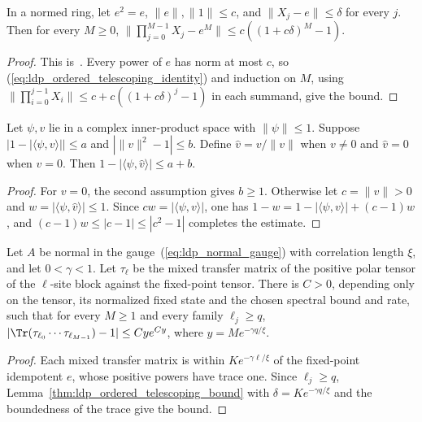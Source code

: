 \begin{lemma}
    \label{thm:ldp_ordered_telescoping_bound}
    \leanok
    In a normed ring, let $e^2=e$, $\lVert e\rVert,\lVert1\rVert\le c$, and
    $\lVert X_j-e\rVert\le\delta$ for every $j$. Then for every $M\ge0$,
    $\lVert\prod_{j=0}^{M-1}X_j-e^M\rVert
        \le c((1+c\delta)^M-1)$.
\end{lemma}
\begin{proof}\leanok
    This is~\cite[``First-order bound near an
        idempotent'']{QICLean2026Blueprint}.
    Every power of $e$ has norm at most $c$, so
    (\ref{eq:ldp_ordered_telescoping_identity}) and induction on $M$, using
    $\lVert\prod_{i=0}^{j-1}X_i\rVert
        \le c+c((1+c\delta)^j-1)$ in each summand, give the bound.
\end{proof}

\begin{lemma}
    \label{thm:ldp_normalization_triangle}
    \leanok
    Let $\psi,v$ lie in a complex inner-product space with
    $\lVert\psi\rVert\le1$. Suppose
    $|1-|\langle\psi,v\rangle||\le a$ and
    $|\lVert v\rVert^2-1|\le b$.
    Define $\widehat v=v/\lVert v\rVert$ when $v\ne0$ and
    $\widehat v=0$ when $v=0$. Then
    $1-|\langle\psi,\widehat v\rangle|\le a+b$.
\end{lemma}
\begin{proof}\leanok
    For $v=0$, the second assumption gives $b\ge1$.
    Otherwise let $c=\lVert v\rVert>0$ and
    $w=|\langle\psi,\widehat v\rangle|\le1$.
    Since $cw=|\langle\psi,v\rangle|$, one has
    $1-w=1-|\langle\psi,v\rangle|+(c-1)w$, and
    $(c-1)w\le|c-1|\le|c^2-1|$ completes the estimate.
\end{proof}

\begin{lemma}
    \label{thm:ldp_unequal_absolute_trace_first_order}
    \leanok
    Let $A$ be normal in the gauge~(\ref{eq:ldp_normal_gauge}) with
    correlation length $\xi$, and let $0<\gamma<1$.
    Let $\tau_\ell$ be the mixed transfer matrix of the positive polar
    tensor of the $\ell$-site block against the fixed-point tensor.
    There is $C>0$, depending only on the tensor, its normalized fixed
    state and the chosen spectral bound and rate, such that for every
    $M\ge1$ and every family $\ell_j\ge q$,
    $|\Tr(\tau_{\ell_0}\cdots\tau_{\ell_{M-1}})-1|
        \le Cy e^{Cy}$, where $y=Me^{-\gamma q/\xi}$.
\end{lemma}
\begin{proof}\leanok
    Each mixed transfer matrix is within $Ke^{-\gamma\ell/\xi}$ of the
    fixed-point idempotent $e$, whose positive powers have trace one.
    Since $\ell_j\ge q$,
    Lemma~\ref{thm:ldp_ordered_telescoping_bound} with
    $\delta=Ke^{-\gamma q/\xi}$ and the boundedness of the trace give the bound.
\end{proof}


